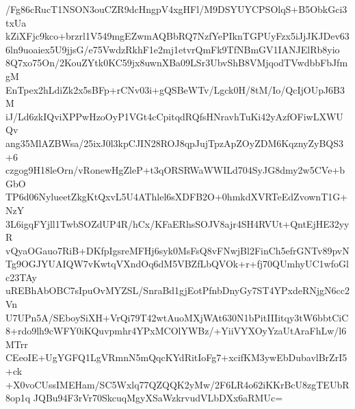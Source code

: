 /Fg86cRucT1NSON3ouCZR9dcHngpV4xgHFl/M9DSYUYCPSOlqS+B5ObkGci3txUa
kZiXFjc9kco+brzrl1V549mgEZwmAQBbRQ7NzfYePIknTGPUyFzx5iJjJKJDev63
6ln9uoaiex5U9jjsG/e75VwdzRkhF1e2mj1etvrQmFk9TfNBmGV1IANJElRb8yio
8Q7xo75On/2KouZYtk0KC59jx8uwnXBa09LSr3UbvShB8VMjqodTVwdbbFbJfmgM
EnTpex2hLdiZk2x5sBFp+rCNv03i+gQSBeWTv/Lgck0H/8tM/Io/QcIjOUpJ6B3M
iJ/Ld6zkIQviXPPwHzoOyP1VGt4cCpitqdRQfsHNravhTuKi42yAzfOFiwLXWUQv
ang35MlAZBWsa/25ixJ0l3kpCJIN28ROJ8qpJujTpzApZOyZDM6KqznyZyBQS3+6
czgog9H18leOrn/vRonewHgZleP+t3qORSRWaWWILd704SyJG8dmy2w5CVe+bGbO
TP6d06NylueetZkgKtQxvL5U4AThlel6sXDFB2O+0hmkdXVRTeEdZvownT1G+NzY
3L6igqFYjll1TwbSOZdUP4R/hCx/KFaERhsSOJV8ajr4SH4RVUt+QntEjHE32yyR
vQyaOGauo7RiB+DKfpIgsreMFHj6syk0MsFsQ8vFNwjBl2FinCh5efrGNTv89pvN
Tg9OGJYUAIQW7vKwtqVXndOq6dM5VBZfLbQVOk+r+fj70QUmhyUC1wfoGlc23TAy
uREBhAbOBC7sIpuOvMYZSL/SnraBd1gjEotPfnbDnyGy7ST4YPxdeRNjgN6cc2Vn
U7UPn5A/SEboySiXH+VrQi79T42wtAuoMXjWAt630N1bPitIIIitqy3tW6bbtCiC
8+rdo9lh9cWFY0iKQuvpmhr4YPxMCOlYWBz/+YiiVYXOyYzaUtAraFhLw/l6MTrr
CEeoIE+UgYGFQ1LgVRmnN5mQqcKYdRitIoFg7+xcifKM3ywEbDubavlBrZrI5+ck
+X0voCUssIMEHam/SC5Wxlq77QZQQK2yMw/2F6LR4o62iKKrBcU8zgTEUbR8op1q
JQBu94F3rVr70SkcuqMgyXSaWzkrvudVLbDXx6aRMUc=
